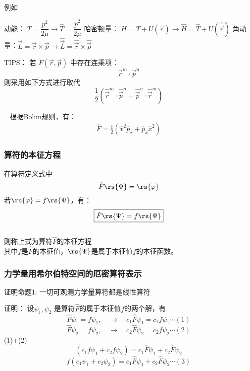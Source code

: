 \begin{frame}    
    \begin{exampleblock}{例如}
        \begin{itemize}
            \Item  动能： $ T=\dfrac{p^2}{2\mu} \to \hat{T}= \dfrac{\hat{p}^2}{2\mu} $
            \Item  哈密顿量： $ H=T+U(\vec{r} ) \to \hat{H}= \hat{T}+ U(\hat{\vec{r}})$
            \Item  角动量：$ \vec{L}=\vec{r}\times\vec{p} \to \hat{\vec{L}}=\hat{\vec{r}}\times \hat{\vec{p}}$
        \end{itemize}
    \end{exampleblock}  
    \alert{TIPS：} 若 $F(\vec{r},\vec{p})$ 中存在连乘项： 
    \[\vec{r}^m\cdot\vec{p}^n\] 
    则采用如下方式进行取代
    \[\frac{1}{2}(\hat{\vec{r}}^m\cdot\hat{\vec{p}}^n+\hat{\vec{p}}^n\cdot\hat{\vec{r}}^m)\]
\end{frame} 

\begin{frame} 
    \例[2. 求经典物理量$F=x^2p_x$的量子力学算符表示] {} 
    \解~ 根据Bohm规则，有：
    \[\begin{aligned}
        \hat{F}=\frac{1}{2} (\hat{x}^2 \hat{p}_x + \hat{p}_x \hat{x}^2 ) 
    \end{aligned}\]   
\end{frame}     

\begin{frame}
    \frametitle{算符的本征方程}
    在算符定义式中
    \[\hat{F} \rs{\Psi}=\rs{\varphi}\]
    若$\rs{\varphi}=f\rs{\Psi}$，有：\\
    \[\boxed{\hat{F} \rs{\Psi}=f\rs{\Psi}}\]
    ~~\\
    则称上式为算符$\hat{F}$的本征方程\\
    其中$f$是$\hat{F}$的本征值，$\rs{\Psi}$是属于本征值$f$的本征函数。
\end{frame}

\begin{frame} 
    \frametitle{力学量用希尔伯特空间的厄密算符表示}
    \begin{tcolorbox1}{证明命题1:}
      一切可观测力学量算符都是线性算符  
    \end{tcolorbox1}
    \alert{证明：}
        设$\psi_1, \psi_2$ 是算符$\hat{F}$的属于本征值$f$的两个解，有\\
        $$\hat{F}\psi_1=f\psi_1, \quad \to \quad c_1\hat{F}\psi_1=c_1f\psi_1 \cdots (1)$$
        $$\hat{F}\psi_2=f\psi_2, \quad \to \quad c_2\hat{F}\psi_2=c_2f\psi_2 \cdots (2)$$
        (1)+(2)
        $$(c_1f\psi_1+c_2f\psi_2)=c_1\hat{F}\psi_1+c_2\hat{F}\psi_2$$
        $$f(c_1\psi_1+c_2\psi_2)=c_1\hat{F}\psi_1+c_2\hat{F}\psi_2\cdots (3)$$
\end{frame} 

